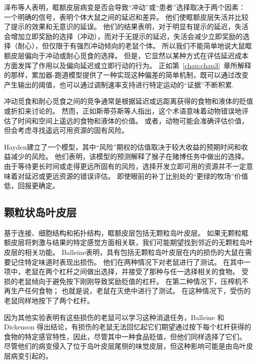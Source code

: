 泽布等人\cite{zeeb2010contributions}表明，眶额皮层病变是否会导致“冲动”或“患者”选择取决于两个因素：
一个明确的信号，表明个体大鼠之间的延迟和差异。
他们使眶额皮层失活并比较了提示的效果和无意识的延误。
他们的结果表明，对于明显有提示的延迟，失活会增加立即奖励的选择（冲动），而对于无提示的延迟，失活会减少立即奖励的选择（耐心），但仅限于有强烈冲动倾向的老鼠个体。
所以我们不能简单地说大鼠眶额皮层偏向于冲动或耐心觅食的选择。
但是，它显然以某种方式在评估延迟成本方面发挥了作用以及偏向延迟或立即行动的行为。
正如第~\ref{chap:chap3}~章所解释的那样，累加器-跑道模型提供了一种实现这种偏差的简单机制，既可以通过改变产生输出的阈值，也可以通过调制速率支持进行特定运动的“证据”不断积累. \par


冲动觅食和耐心觅食之间的竞争通常是根据延迟或远距离获得的食物和液体的贬值或折扣来讨论的。
然而，正如斯蒂芬斯等人\cite{stephens2004impulsiveness}指出，这个术语意味着动物错误地评估了时间和空间上遥远的食物和液体的价值。
或者，动物可能会准确评估价值，但会考虑寻找遥远可用资源的固有风险。 \par


Hayden\cite{hayden2007temporal}建立了一个模型，其中“风险”期权的估值取决于较大收益的预期时间和收益减少的风险。
他们表明，该模型的预测解释了猴子在赌博任务中做出的选择。
由于等待更长时间或走得更远所固有的风险，选择开发立即可用的资源并不一定意味着对延迟或更远资源的错误评估。
即使眼前的补丁比别处的“更绿的牧场”价值低，回报更确定。



\subsection{颗粒状岛叶皮层}

基于连接、细胞结构和拓扑结构，眶额皮层包括无颗粒岛叶皮层\cite{carmichael1994architectonic}。
如果无颗粒眶额皮层将刺激与结果的特定感觉方面相关联，我们可能期望找到邻近的无颗粒岛叶皮层的相关功能。
Balleine\cite{balleine2000effect}表明，具有包括无颗粒岛叶皮层在内的损伤的大鼠在需要记住特定味道时表现出损伤。
他们在两种情况下对老鼠进行了测试。
在其中一项中，老鼠在两个杠杆之间做出选择，并接受了那种与任一选择相关的食物。
受损的老鼠倾向于避免按下刚刚导致奖励贬值的杠杆。
在第二种情况下，压榨机不再生产任何食物；
也就是说，老鼠在灭绝中进行了测试。
在这种情况下，受伤的老鼠同样地按下了两个杠杆。\par


因为其他实验表明有这些损伤的老鼠可以学习这种消退任务，Balleine 和 Dickenson 得出结论，有损伤的老鼠无法回忆起它们期望通过按下每个杠杆获得的食物的特定感官特性，因此，尽管其中一种食品贬值，但他们同样选择了它们。
尽管他们的病变侵入了位于岛叶皮层尾侧的味觉皮层，但这种影响可能是由岛叶皮层病变引起的。\par


